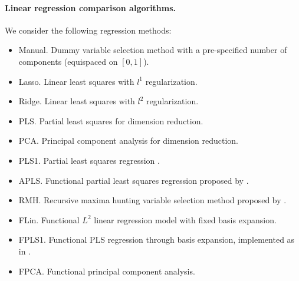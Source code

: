 \paragraph{Linear regression comparison algorithms.} We consider the following regression methods:
\begin{itemize}
  \item Manual.\hspace{.3em} Dummy variable selection method with a pre-specified number of components (equispaced on \([0, 1]\)).
  \item Lasso.\hspace{.3em} Linear least squares with \(l^1\) regularization.
  \item Ridge.\hspace{.3em} Linear least squares with \(l^2\) regularization.
  \item PLS.\hspace{.3em} Partial least squares for dimension reduction.
  \item PCA.\hspace{.3em} Principal component analysis for dimension reduction.
  \item PLS1.\hspace{.3em} Partial least squares regression \citep[e.g.][]{wegelin2000survey}.
  \item APLS.\hspace{.3em} Functional partial least squares regression proposed by \citet{delaigle2012methodology}.
  \item RMH.\hspace{.3em} Recursive maxima hunting variable selection method proposed by \citet{torrecilla2016feature}.
  \item FLin.\hspace{.3em} Functional \(L^2\) linear regression model with fixed basis expansion.
  \item FPLS1.\hspace{.3em} Functional PLS regression through basis expansion, implemented as in \citet{aguilera2010using}.
  \item FPCA.\hspace{.3em} Functional principal component analysis.
\end{itemize}

